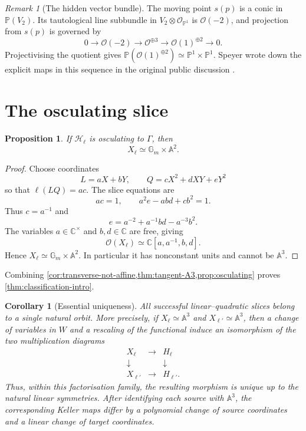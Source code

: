 \documentclass[11pt,reqno]{amsart}
\newtheorem{proposition}[proposition]{Proposition}
\newtheorem{corollary}[corollary]{Corollary}
\theoremstyle{definition}
\theoremstyle{remark}
\newtheorem{remark}[remark]{Remark}
\newcommand{\A}{\mathbb A}
\newcommand{\Pj}{\mathbb P}
\newcommand{\Gm}{\mathbb G_m}
\newcommand{\C}{\mathbb C}
\newcommand{\OO}{\mathcal O}
\newcommand{\cH}{\mathscr H}
\begin{document}
\begin{remark}[The hidden vector bundle]\label{rem:hidden-bundle}
The moving point $s(p)$ is a conic in $\Pj(V_2)$.  Its tautological line
subbundle in $V_2\otimes\OO_{\Pj^1}$ is $\OO(-2)$, and projection from
$s(p)$ is governed by
\[
 0\longrightarrow\OO(-2)
 \longrightarrow\OO^{\oplus3}
 \longrightarrow\OO(1)^{\oplus2}
 \longrightarrow0.
\]
Projectivising the quotient gives
$\Pj(\OO(1)^{\oplus2})\simeq\Pj^1\times\Pj^1$.  Speyer wrote down the
explicit maps in this sequence in the original public discussion
\cite{SpeyerThread}.
\end{remark}

\section{The osculating slice}

\begin{proposition}\label{prop:osculating}
If $\cH_\ell$ is osculating to $\Gamma$, then
\[
 X_\ell\simeq\Gm\times\A^2.
\]
\end{proposition}

\begin{proof}
Choose coordinates
\[
 L=aX+bY,
 \qquad
 Q=cX^2+dXY+eY^2
\]
so that $\ell(LQ)=ac$.  The slice equations are
\[
 ac=1,
 \qquad
 a^2e-abd+cb^2=1.
\]
Thus $c=a^{-1}$ and
\[
 e=a^{-2}+a^{-1}bd-a^{-3}b^2.
\]
The variables $a\in\C^\times$ and $b,d\in\C$ are free, giving
\[
 \OO(X_\ell)\simeq\C[a,a^{-1},b,d].
\]
Hence $X_\ell\simeq\Gm\times\A^2$.  In particular it has nonconstant
units and cannot be $\A^3$.
\end{proof}

Combining \cref{cor:transverse-not-affine,thm:tangent-A3,prop:osculating}
proves \cref{thm:classification-intro}.

\begin{corollary}[Essential uniqueness]\label{cor:essential-uniqueness}
All successful linear--quadratic slices belong to a single natural orbit.
More precisely, if $X_\ell\simeq\A^3$ and
$X_{\ell'}\simeq\A^3$, then a change of variables in $W$ and a
rescaling of the functional induce an isomorphism of the two
multiplication diagrams
\[
 \begin{array}{ccc}
 X_\ell&\longrightarrow&H_\ell\\
 \downarrow&&\downarrow\\
 X_{\ell'}&\longrightarrow&H_{\ell'}.
 \end{array}
\]
Thus, within this factorisation family, the resulting morphism is unique
up to the natural linear symmetries.  After identifying each source with
$\A^3$, the corresponding Keller maps differ by a polynomial change of
source coordinates and a linear change of target coordinates.
\end{corollary}
\end{document}
